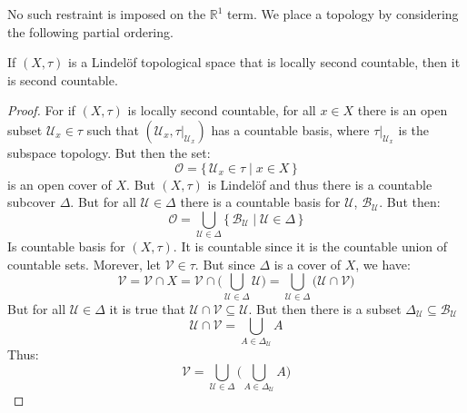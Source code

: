 \documentclass{article}                                                        %
\begin{document}
        No such restraint is imposed on the $\mathbb{R}^{1}$ term. We place
        a topology by considering the following partial ordering.
        \begin{theorem}
                If $(X,\tau)$ is a Lindel\"{o}f topological space that is
                locally second countable, then it is second countable.
        \end{theorem}
        \begin{proof}
                For if $(X,\tau)$ is locally second countable, for all $x\in{X}$
                there is an open subset $\mathcal{U}_{x}\in\tau$ such that
                $(\mathcal{U}_{x},\tau|_{\mathcal{U}_{x}})$ has a countable
                basis, where $\tau|_{\mathcal{U}_{x}}$ is the subspace topology.
                But then the set:
                \begin{equation}
                    \mathcal{O}=
                    \{\,\mathcal{U}_{x}\in\tau\;|\;x\in{X}\,\}
                \end{equation}
                is an open cover of $X$. But $(X,\tau)$ is Lindel\"{o}f and thus
                there is a countable subcover $\Delta$. But for all
                $\mathcal{U}\in\Delta$ there is a countable basis for
                $\mathcal{U}$, $\mathscr{B}_{\mathcal{U}}$. But then:
                \begin{equation}
                    \mathscr{O}=
                    \bigcup_{\mathcal{U}\in\Delta}
                        \{\,\mathscr{B}_{\mathcal{U}}\;|\;
                            \mathcal{U}\in\Delta\,\}
                \end{equation}
                Is countable basis for $(X,\tau)$. It is countable since it is
                the countable union of countable sets. Morever, let
                $\mathcal{V}\in\tau$. But since $\Delta$ is a cover of $X$, we
                have:
                \begin{equation}
                    \mathcal{V}
                    =\mathcal{V}\cap{X}
                    =\mathcal{V}\cap\Big(
                        \bigcup_{\mathcal{U}\in\Delta}\mathcal{U}
                    \Big)
                    =\bigcup_{\mathcal{U}\in\Delta}\big(
                        \mathcal{U}\cap\mathcal{V}
                    \big)
                \end{equation}
                But for all $\mathcal{U}\in\Delta$ it is true that
                $\mathcal{U}\cap\mathcal{V}\subseteq\mathcal{U}$. But then there
                is a subset
                $\Delta_{\mathcal{U}}\subseteq\mathscr{B}_{\mathcal{U}}$
                \begin{equation}
                    \mathcal{U}\cap\mathcal{V}=
                    \bigcup_{A\in\Delta_{\mathcal{U}}}A
                \end{equation}
                Thus:
                \begin{equation}
                    \mathcal{V}=\bigcup_{\mathcal{U}\in\Delta}\Big(
                        \bigcup_{A\in\Delta_{\mathcal{U}}}A\Big)
                \end{equation}
        \end{proof}
\end{document}
